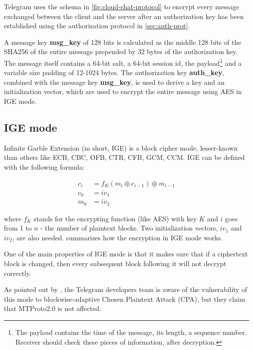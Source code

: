 Telegram uses the schema in \cref{fig:cloud-chat-protocol} to encrypt every message exchanged between the client and the server after an authorization key has been established using the authorization protocol in \cref{sec:auth-prot}.

A message key \textbf{msg\_key} of 128 bits is calculated as the middle 128 bits of the SHA256 of the entire message prepended by 32 bytes of the authorization key. The message itself contains a 64-bit salt, a 64-bit session id, the payload\footnote{The payload contains the time of the message, its length, a sequence number. Receiver should check these pieces of information, after decryption.} and a variable size padding of 12-1024 bytes.
The authorization key \textbf{auth\_key}, combined with the message key \textbf{msg\_key}, is used to derive a key and an initialization vector, which are used to encrypt the entire message using AES in IGE mode.

\subsection{IGE mode}
Infinite Garble Extension (in short, IGE) is a block cipher mode, lesser-known than others like ECB, CBC, OFB, CTR, CFB, GCM, CCM.
IGE can be defined with the following formula:

\begin{equation}
    \begin{aligned}
        c_i & = f_K(m_i \oplus c_{i-1}) \oplus m_{i-1} \\
        c_0 & = iv_1                                   \\
        m_0 & = iv_2
    \end{aligned}
\end{equation}

where $f_K$ stands for the encrypting function (like AES) with key $K$
and $i$ goes from 1 to $n$ - the number of plaintext blocks. Two initialization vectors, $iv_1$ and $iv_2$, are also needed.  summarizes how the encryption in IGE mode works.


One of the main properties of IGE mode is that it makes sure that if a ciphertext block is changed, then every subsequent block following it will not decrypt correctly.

As pointed out by \cite{Telegram-AFAQ-IGE}, the Telegram developers team is aware of the vulnerability of this mode to blockwise-adaptive Chosen Plaintext Attack (CPA)\cite{IGE-CPA}, but they claim that MTProto2.0 is not affected.




